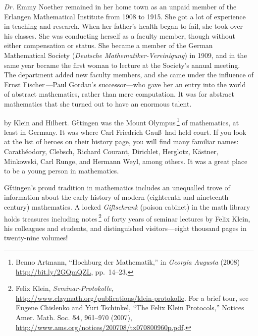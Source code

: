 \documentclass[twoside,symmetric]{tufte-handout}
\begin{document}
\emph{Dr.} Emmy Noether remained in her home town as an unpaid member of the Erlangen Mathematical Institute from 1908 to 1915. She got a lot of experience in teaching and research. When her father's health began to fail, she took over his classes. She was conducting herself as a faculty member, though without either compensation or status. She became a member of the German Mathematical Society (\emph{Deutsche Mathematiker-Vereinigung}) in 1909, and in the same year became the first woman to lecture at the Society's annual meeting. The department added new faculty members, and she came under the influence of Ernst Fischer$\,$\cite{ernstfischer}---Paul Gordan's successor---who gave her an entry into the world of abstract mathematics, rather than mere computation. It was for abstract mathematics that she turned out to have an enormous talent.

 by Klein and Hilbert. G\"ttingen was the Mount Olympus$\,$\footnote{Benno Artmann,
``Hochburg der Mathematik,'' in \emph{Georgia Augusta} (2008) \url{http://bit.ly/2GQmQZL}, pp.~14--23.} of mathematics, at least in Germany. It was  where Carl Friedrich Gau\ss\ had held court. If you look at the list of heroes on their history page, you will find many familiar names: Carathéodory, Clebsch, Richard Courant, Dirichlet, Herglotz, Kästner, Minkowski, Carl Runge, and  Hermann Weyl, among others. It was a great place to be a young person in mathematics.

G\"ttingen's proud tradition in mathematics includes an unequalled trove of information about the early history of modern (eighteenth and nineteenth century) mathematics. A locked \emph{Giftschrank} (poison cabinet) in the math library holds treasures including notes$\,$\footnote[][-15pt]{Felix Klein, \emph{Seminar-Protokolle,} \url{http://www.claymath.org/publications/klein-protokolle}. For a brief tour, see Eugene Chislenko and Yuri Tschinkel, ``The Felix Klein Protocols,'' Notices Amer. Math. Soc. \textbf{54}, 961--970 (2007), \url{http://www.ams.org/notices/200708/tx070800960p.pdf}.} of forty years of seminar lectures by Felix Klein, his colleagues and students, and distinguished visitors---eight thousand pages in twenty-nine volumes!
\end{document}
